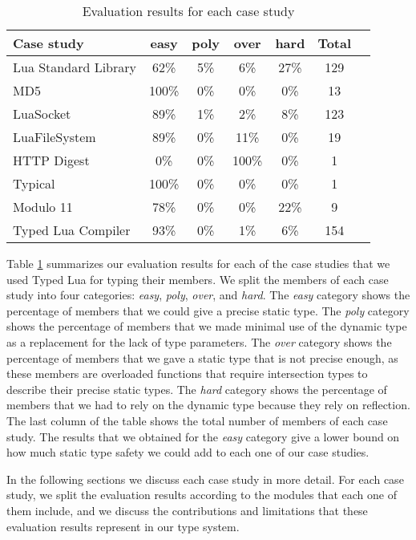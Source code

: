 \begin{table}[!ht]
\begin{center}
\begin{tabular}{|l|c|c|c|c|c|c|}
\hline
\textbf{Case study} & \textbf{easy} & \textbf{poly} & \textbf{over} & \textbf{hard} & \textbf{Total} \\
\hline
Lua Standard Library & 62\% & 5\% & 6\% & 27\% & 129 \\ %
\hline
MD5 & 100\% & 0\% & 0\% & 0\% & 13 \\ %
\hline
LuaSocket & 89\% & 1\% & 2\% & 8\% & 123 \\ %
\hline
LuaFileSystem & 89\% & 0\% & 11\% & 0\% & 19 \\ %
\hline
HTTP Digest & 0\% & 0\% & 100\% & 0\% & 1 \\ %
\hline
Typical & 100\% & 0\% & 0\% & 0\% & 1 \\ %
\hline
Modulo 11 & 78\% & 0\% & 0\% & 22\% & 9 \\ %
\hline
Typed Lua Compiler & 93\% & 0\% & 1\% & 6\% & 154 \\ %
\hline
\end{tabular}
\end{center}
\caption{Evaluation results for each case study}
\label{tab:evalbycase}
\end{table}

Table \ref{tab:evalbycase} summarizes our evaluation results for each
of the case studies that we used Typed Lua for typing their members.
We split the members of each case study into four categories:
\emph{easy}, \emph{poly}, \emph{over}, and \emph{hard}.
The \emph{easy} category shows the percentage of members that
we could give a precise static type.
The \emph{poly} category shows the percentage of members that
we made minimal use of the dynamic type as a replacement for the
lack of type parameters.
The \emph{over} category shows the percentage of members that
we gave a static type that is not precise enough,
as these members are overloaded functions that require intersection
types to describe their precise static types.
The \emph{hard} category shows the percentage of members that
we had to rely on the dynamic type because they rely on reflection.
The last column of the table shows the total number of members
of each case study.
The results that we obtained for the \emph{easy} category give
a lower bound on how much static type safety
we could add to each one of our case studies.

In the following sections we discuss each case study in more detail.
For each case study, we split the evaluation results according
to the modules that each one of them include,
and we discuss the contributions and limitations that these
evaluation results represent in our type system.

